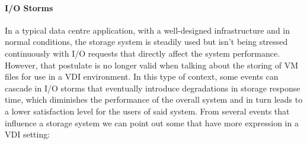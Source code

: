 \paragraph{I/O Storms}
\label{par:res_ios_storms}

In a typical data centre application, with a well-designed infrastructure and in normal conditions, the storage system is steadily used but isn't being stressed continuously with I/O requests that directly affect the system performance. However, that postulate is no longer valid when talking about the storing of VM files for use in a VDI environment. In this type of context, some events can cascade in I/O storms that eventually introduce degradations in storage response time, which diminishes the performance of the overall system and in turn leads to a lower satisfaction level for the users of said system.
From several events that influence a storage system we can point out some that have more expression in a VDI setting:

